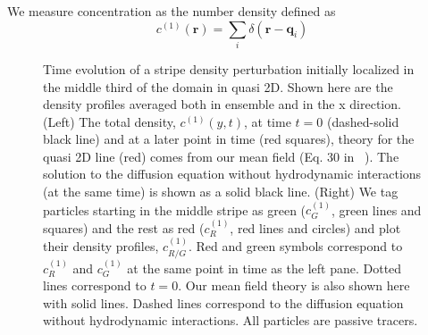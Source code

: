 \documentclass[ twoside,openright,titlepage,numbers=noenddot,%
headinclude,footinclude,cleardoublepage=empty,abstract=on,
BCOR=5mm,paper=b5,fontsize=11pt, dvipsnames
]{scrreprt}
\renewcommand{\vec}[1]{\bm{#1}}
\newcommand{\ppos}{q}
\newcommand{\fpos}{r}
\begin{document}
We measure concentration as the number density defined as
\begin{equation}
  c^{(1)}(\vec{\fpos}) = \sum_i\delta(\vec{\fpos}-\vec{\ppos}_i)
\end{equation}
\begin{figure}[H]
  \centering
  \hspace*{-2.0cm}
  \caption{Time evolution of a stripe density perturbation initially localized in the middle third of the domain in quasi 2D. Shown here are the density profiles averaged both in ensemble and in the x direction. (Left) The total density, $c^{(1)}(y, t)$, at time $t=0$ (dashed-solid black line) and at a later point in time (red squares), theory for the quasi 2D line (red) comes from our mean field (Eq. 30 in ~\cite{Pelaez2018}). The solution to the diffusion equation without hydrodynamic interactions (at the same time) is shown as a solid black line. (Right) We tag particles starting in the middle stripe as green ($c^{(1)}_G$, green lines and squares) and the rest as red ($c^{(1)}_R$, red lines and circles) and plot their density profiles, $c^{(1)}_{R/G}$. Red and green symbols correspond to $c^{(1)}_R$ and $c^{(1)}_G$ at the same point in time as the left pane. Dotted lines correspond to $t=0$. Our mean field theory is also shown here with solid lines. Dashed lines correspond to the diffusion equation without hydrodynamic interactions. All particles are passive tracers.}
  \label{fig:q2Doverdens}
\end{figure}
\end{document}
